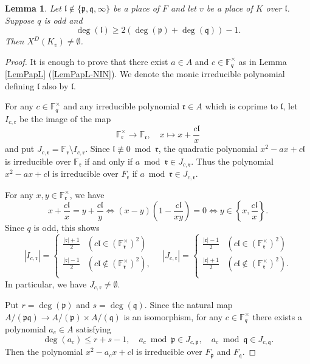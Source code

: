 \documentclass[10pt]{amsart}
\theoremstyle{plain}
\newtheorem{lem}[thm]{Lemma}
\theoremstyle{definition}
\newcommand{\bF}{\mathbb{F}}
\newcommand{\frl}{\mathfrak{l}}
\newcommand{\frp}{\mathfrak{p}}
\newcommand{\frq}{\mathfrak{q}}
\newcommand{\frr}{\mathfrak{r}}
\begin{document}
\begin{lem}\label{LemELocalL}
	Let $\frl\notin\{\frp,\frq,\infty\}$ be a place of $F$ and let $v$ be a place of $K$ over $\frl$.
	Suppose $q$ is odd and
	\[
	\deg(\frl)\geq 2(\deg(\frp)+\deg(\frq))-1.
	\] 
	Then $X^D(K_v)\neq \emptyset$.
\end{lem}
\begin{proof}
	It is enough to prove that there exist $a\in A$ and $c\in \bF_q^\times$ as in Lemma \ref{LemPapL} (\ref{LemPapL-NIN}).
	We denote the monic irreducible polynomial defining $\frl$ also by $\frl$.
	
	For any $c\in \bF_q^\times$ and any irreducible polynomial $\frr\in A$ which is coprime to $\frl$, let $I_{c,\frr}$ be the image of the map
	\[
	\bF_\frr^\times\to \bF_\frr,\quad x\mapsto x+\frac{c\frl}{x}
	\]
	and put $J_{c,\frr}=\bF_\frr\setminus I_{c,\frr}$. 
	Since $\frl\not\equiv 0\bmod \frr$, the quadratic polynomial $x^2-ax+c\frl$ is irreducible over $\bF_\frr$
	if and only if $a\bmod \frr\in J_{c,\frr}$.
	Thus the polynomial $x^2-ax+c\frl$ is irreducible over $F_\frr$ if
	$a\bmod \frr\in J_{c,\frr}$.
	
	
	For any $x,y\in \bF_\frr^\times$, we have
	\[
	x+\frac{c\frl}{x}=y+\frac{c\frl}{y}\Leftrightarrow (x-y)\left(1-\frac{c\frl}{xy}\right)=0\Leftrightarrow y\in\left\{x,\frac{c\frl}{x}\right\}.
	\]
	Since $q$ is odd, this shows
	\[
	|I_{c,\frr}|=\left\{\begin{array}{ll}
		\frac{|\frr|+1}{2} & (c \frl\in(\bF_\frr^\times)^2)\\
		\frac{|\frr|-1}{2} & (c \frl\notin(\bF_\frr^\times)^2),\\
	\end{array}\right.\quad
	|J_{c,\frr}|=\left\{\begin{array}{ll}
		\frac{|\frr|-1}{2} & (c \frl\in(\bF_\frr^\times)^2)\\
		\frac{|\frr|+1}{2} & (c \frl\notin(\bF_\frr^\times)^2).\\
	\end{array}\right.
	\]
	In particular, we have $J_{c,\frr}\neq \emptyset$.
	
	Put $r=\deg(\frp)$ and $s=\deg(\frq)$.
	Since the natural map $A/(\frp \frq)\to A/(\frp)\times A/(\frq)$ is an isomorphism,
	for any $c\in \bF_q^\times$ there exists a polynomial $a_c\in A$ satisfying 
	\[
	\deg(a_c)\leq r+s-1,\quad a_c\bmod \frp\in J_{c,\frp},\quad a_c\bmod \frq \in J_{c,\frq}.
	\]
	Then the polynomial $x^2-a_c x+ c\frl$ is irreducible over $F_\frp$ and $F_\frq$.
	

\end{proof}
\end{document}

